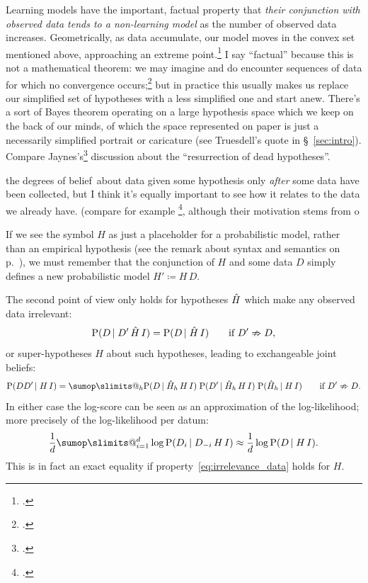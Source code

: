 \documentclass[\ifafour a4paper,12pt,\else a5paper,10pt,\fi%
onecolumn,oneside,article,%
british%
]{memoir}
\makeatletter
\theoremstyle{remark}
\theoremstyle{innote}
\def\sum{\DOTSI\sumop\slimits@}
\newcommand*{\citep}{\footcites}
\newcommand*{\defd}{\coloneqq}
\newcommand*{\p}{\mathrm{P}}%
\renewcommand*{\|}[1][]{\nonscript\,#1\vert\nonscript\;\mathopen{}}
\newcommand*{\sect}{\S}%
\newcommand*{\chap}{ch.}%
\newcommand*{\eg}{{e.g.}}
\newcommand*{\dobs}{degrees of belief}
\newcommand*{\yK}{I}
\newcommand*{\hH}{\Hat{H}}
\makeatother
\begin{document}
Learning models have the important, factual property that \emph{their
  conjunction with observed data tends to a non-learning model} as the
number of observed data increases. Geometrically, as data accumulate, our
model moves in the convex set mentioned above, approaching an extreme
point.\citep[compare Hjort in][]{barronetal1986}[\chap~3]{hjort1986} I say
\enquote{factual} because this is not a mathematical theorem: we may
imagine and do encounter sequences of data for which no convergence occurs;\citep[see
\eg][]{bruno1964,berk1966,berk1970}[also][\sect~3]{diaconis1988} but in
practice this usually makes us replace our simplified set of hypotheses
with a less simplified one and start anew. There's a sort of Bayes theorem
operating on a large hypothesis space which we keep on the back of our
minds, of which the space represented on paper is just a necessarily
simplified portrait or caricature (see Truesdell's quote in
\sect~\ref{sec:intro}). Compare Jaynes's\citep[\sect~4.4.1]{jaynes1994_r2003} discussion about the
\enquote{resurrection of dead hypotheses}.



the \dobs\ about data given some
hypothesis only \emph{after} some data have been collected, but I think
it's equally important to see how it relates to the data we already have.
(compare for example \citep{ohagan1995,bergeretal1996,bergeretal1998},
although their motivation stems from o

If we see the symbol $H$ as just a placeholder for a probabilistic model,
rather than an empirical hypothesis (see the remark about syntax and
semantics on p.~\pageref{note:syntax}), we must remember that the
conjunction of $H$ and some data $D$ simply defines a new probabilistic
model $H' \defd H \, D$.



The second point of view only holds for hypotheses $\hH$ which make any
observed data irrelevant:
\begin{equation}
  \label{eq:irrelevance_data}
  \p(D \| D' \, \hH \, \yK) = \p(D \| \hH \, \yK)
  \qquad\text{if $D' \nRightarrow D$},
\end{equation}
or super-hypotheses $H$ about such hypotheses, leading to exchangeable
joint beliefs:
\begin{equation}
  \label{eq:superhypothesis_irrelevance_data}
  \p(D D' \| H \, \yK) = \sum_{h} \p(D \| \hH_{h} \, H \, \yK)\;
  \p(D' \| \hH_{h} \, H \, \yK)\;
  \p(\hH_{h} \| H \, \yK)
  \qquad\text{if $D' \nRightarrow D$}.
\end{equation}
In either case the log-score can be seen as an approximation of the log-likelihood;
more precisely of the log-likelihood per datum:
\begin{equation}
  \label{eq:logscore_approx_loglh}
  \frac{1}{d} \sum_{i=1}^{d} \log\p(D_{i} \| D_{-i} \, H \, \yK)
  \approx \frac{1}{d} \log\p(D \| H \, \yK).
\end{equation}
This is in fact an exact equality if property~\eqref{eq:irrelevance_data}
holds for $H$.
\end{document}
